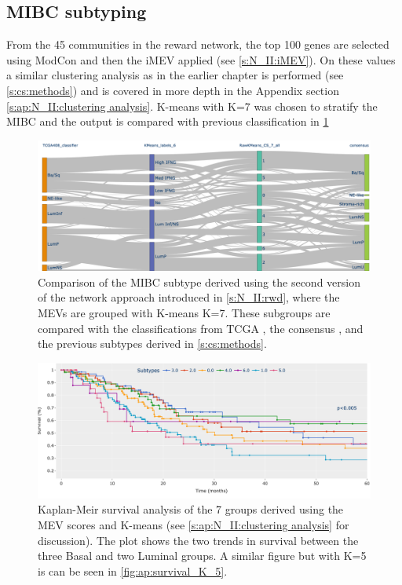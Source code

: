 \subsection{MIBC subtyping}

From the 45 communities in the reward network, the top 100 genes are selected using ModCon and then the iMEV applied (see \cref{s:N_II:iMEV}). On these values a similar clustering analysis as in the earlier chapter is performed (see \cref{s:cs:methods}) and is covered in more depth in the Appendix section 
\cref{s:ap:N_II:clustering analysis}. K-means with K=7 was chosen to stratify the MIBC and the output is compared with previous classification in \cref{fig:N_II:mibc_comp}


\begin{figure}[H]    
    \centering
    \includegraphics[width=1.0\textwidth,height=1.0\textheight,keepaspectratio]{Sections/Network_II/resources/reward/cluster_comp_final.png}
    \caption{Comparison of the MIBC subtype derived using the second version of the network approach introduced in \cref{s:N_II:rwd}, where the MEVs are grouped with K-means K=7. These subgroups are compared with the classifications from TCGA \citep{Robertson2017-mg}, the consensus \citep{Kamoun2020-tj}, and the previous subtypes derived in \cref{s:cs:methods}.}
    \label{fig:N_II:mibc_comp}
\end{figure}


\begin{figure}[H]    
    \centering
    \includegraphics[width=1.0\textwidth,height=1.0\textheight,keepaspectratio]{Sections/Network_II/resources/reward/cluster_analysis/survival_K_7.png}
    \caption{Kaplan-Meir survival analysis of the 7 groups derived using the MEV scores and K-means (see \ref{s:ap:N_II:clustering analysis} for discussion). The plot shows the two trends in survival between the three Basal and two Luminal groups. A similar figure but with K=5 is can be seen in \cref{fig:ap:survival_K_5}. }
    \label{fig:N_II:survival_K_7}
\end{figure}




